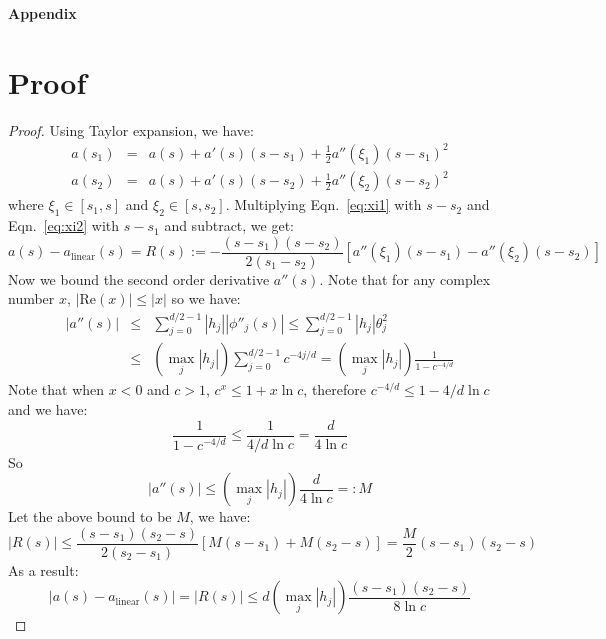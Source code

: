 \documentclass{article} %
\theoremstyle{definition}
\begin{document}
\def\dd{\mathrm{d}}

\newpage
\begin{center}
\textbf{\Large{Appendix}}    
\end{center}

\appendix 
\section{Proof}
\label{sec:proof}
\interp*
\begin{proof}
Using Taylor expansion, we have:
\begin{eqnarray}
    a(s_1) &=& a(s) + a'(s)(s-s_1) + \frac12 a''(\xi_1)(s-s_1)^2 \label{eq:xi1} \\
    a(s_2) &=& a(s) + a'(s)(s-s_2) + \frac12 a''(\xi_2)(s-s_2)^2 \label{eq:xi2}
\end{eqnarray}
where $\xi_1\in [s_1,s]$ and $\xi_2\in [s,s_2]$. Multiplying Eqn.~\ref{eq:xi1} with $s-s_2$ and Eqn.~\ref{eq:xi2} with $s-s_1$ and subtract, we get:
\begin{equation}
    a(s) - a_{\mathrm{linear}}(s) = R(s) := -\frac{(s-s_1)(s-s_2)}{2(s_1-s_2)}\left[a''(\xi_1)(s-s_1) - a''(\xi_2)(s-s_2)\right] 
\end{equation}
Now we bound the second order derivative $a''(s)$. Note that for any complex number $x$, $|\mathrm{Re}(x)| \le |x|$ so we have:
\begin{eqnarray}
    |a''(s)| &\le& \sum_{j=0}^{d/2-1} |h_j| |\phi''_j(s)| \le \sum_{j=0}^{d/2-1} |h_j| \theta^2_j \\
    &\le& \left(\max_j |h_j|\right) \sum_{j=0}^{d/2-1} c^{-4j/d} = \left(\max_j |h_j|\right) \frac{1}{1 - c^{-4/d}}
\end{eqnarray}
Note that when $x < 0$ and $c > 1$, $c^x \le 1 + x\ln c$, therefore $c^{-4/d} \le 1 - 4/d\ln c$ and we have:
\begin{equation}
    \frac{1}{1-c^{-4/d}} \le \frac{1}{4/d \ln c} = \frac{d}{4\ln c}
\end{equation}
So 
\begin{equation}
    |a''(s)| \le \left(\max_j |h_j|\right)\frac{d}{4\ln c} =: M
\end{equation}
Let the above bound to be $M$, we have:
\begin{equation}
    |R(s)| \le \frac{(s-s_1)(s_2-s)}{2(s_2-s_1)}\left[M(s-s_1) + M(s_2-s)\right] = \frac{M}{2}(s-s_1)(s_2-s)
\end{equation}
As a result:
\begin{equation}
    |a(s) - a_{\mathrm{linear}}(s)| = |R(s)| \le d\left(\max_j |h_j|\right) \frac{(s-s_1)(s_2-s)}{8\ln c}
\end{equation}
\end{proof}
\end{document}

